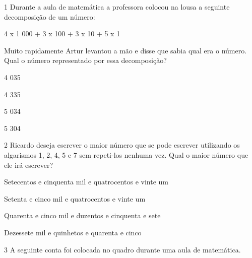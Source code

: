 \num{1} Durante a aula de matemática a professora colocou na lousa a
seguinte decomposição de um número:

4 x 1 000 + 3 x 100 + 3 x 10 + 5 x 1

Muito rapidamente Artur levantou a mão e disse que sabia qual era o
número. Qual o número representado por essa decomposição?

\begin{escolha}
\item
  4 035
\item
  4 335
\item
  5 034
\item
  5 304
\end{escolha}


\num{2} Ricardo deseja escrever o maior número que se pode escrever
utilizando os algarismos 1, 2, 4, 5 e 7 sem repeti-los nenhuma vez. Qual
o maior número que ele irá escrever?

\begin{escolha}
\item
  Setecentos e cinquenta mil e quatrocentos e vinte um
\item
  Setenta e cinco mil e quatrocentos e vinte um
\item
  Quarenta e cinco mil e duzentos e cinquenta e sete
\item
  Dezessete mil e quinhetos e quarenta e cinco
\end{escolha}


\num{3} A seguinte conta foi colocada no quadro durante uma aula de
matemática.


